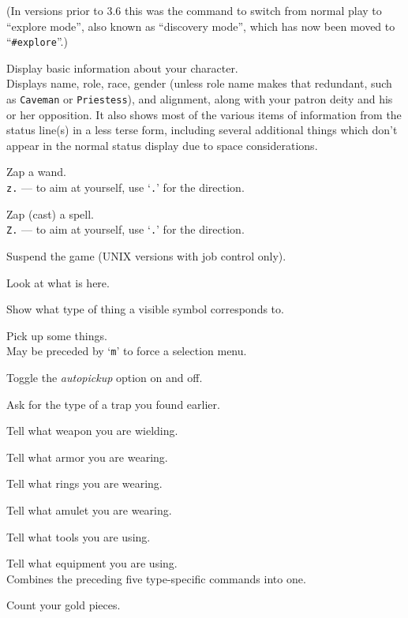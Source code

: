 (In versions prior to 3.6 this was the command to switch from normal
play to ``explore mode'', also known as ``discovery mode'', which has now
been moved to ``{\tt \#explore}''.)
\item[\tb{\^{}X}]
Display basic information about your character.\\
Displays name, role, race, gender (unless role name makes that
redundant, such as {\tt Caveman} or {\tt Priestess}), and alignment,
along with your patron deity and his or her opposition.  It also
shows most of the various items of information from the status line(s)
in a less terse form, including several additional things which don't
appear in the normal status display due to space considerations.
\item[\tb{z}]
Zap a wand.\\
{\tt z.} --- to aim at yourself, use `{\tt .}' for the direction.
\item[\tb{Z}]
Zap (cast) a spell.\\
{\tt Z.} --- to aim at yourself, use `{\tt .}' for the direction.
\item[\tb{\^{}Z}]
Suspend the game (UNIX versions with job control only).
\item[\tb{:}]
Look at what is here.
\item[\tb{;}]
Show what type of thing a visible symbol corresponds to.
\item[\tb{,}]
Pick up some things.\\
May be preceded by `{\tt m}' to force a selection menu.
\item[\tb{@}]
Toggle the {\it autopickup\/} option on and off.
\item[\tb{\^{}}]
Ask for the type of a trap you found earlier.
\item[\tb{)}]
Tell what weapon you are wielding.
\item[\tb{[}]
Tell what armor you are wearing.
\item[\tb{=}]
Tell what rings you are wearing.
\item[\tb{"}]
Tell what amulet you are wearing.
\item[\tb{(}]
Tell what tools you are using.
\item[\tb{*}]
Tell what equipment you are using.\\
Combines the preceding five type-specific
commands into one.
\item[\tb{\$}]
Count your gold pieces.
